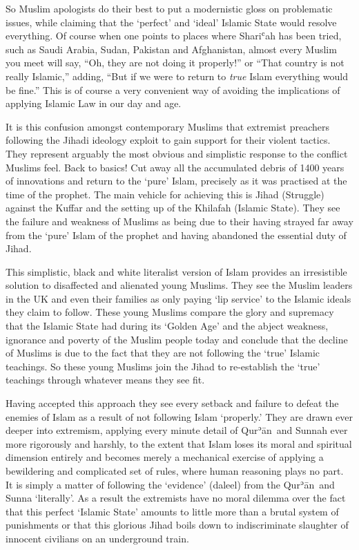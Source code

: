 \documentclass[12pt]{memoir}
\def\´{ʾ} %
\def\`{ʿ} %
\newcommand{\cor}[2]{#2} %
\def \Quran{Qur\-\´ān} %
\def\–{-\hskip0pt}
\begin{document}
So Muslim apologists do their best to put a modernistic gloss
on problematic issues, while claiming
that the ‘perfect’ and ‘ideal’ Islamic State would resolve everything.
Of course when one points to places where Shari\`ah has been tried,
such as Saudi Arabia, Sudan, Pakistan and Afghanistan,
almost every Muslim you meet will say,
“Oh, they are not doing it properly!” or
“That country is not really Islamic,” adding,
“But if we were to return to \emph{true} Islam everything would be fine.”
This is of course a very convenient way of avoiding
the implications of applying Islamic Law in our day and age.

It is this confusion amongst contemporary Muslims
that extremist preachers following the Jihadi ideology
exploit to gain support for their violent tactics.
They represent arguably the most obvious and simplistic response
to the conflict Muslims feel.
Back to basics! Cut away all the accumulated debris of 1400 years
of innovations and return to the ‘pure’ Islam,
precisely as it was practised at the time of the prophet.
The main vehicle for achieving this is Jihad (Struggle)
against the Kuffar and the setting up of the Khilafah (Islamic State).
They see the failure and weakness of Muslims as being due to
their having strayed far away from the ‘pure’ Islam of the prophet
and having abandoned the essential duty of Jihad.

This simplistic, black and white literalist version of Islam provides
an irresistible solution to disaffected and alienated young Muslims.
They see the Muslim leaders in the UK and even their families
as only paying ‘lip service’ to the Islamic ideals they claim to follow.
These young Muslims compare the glory and supremacy
that the Islamic State had during its ‘Golden Age’
and the abject weakness, ignorance and poverty of the Muslim people today
and conclude that the decline of Muslims is due to the fact
that they are not following the ‘true’ Islamic teachings.
So these young Muslims join the Jihad to re\–establish
the ‘true’ teachings through whatever means they see fit.

Having accepted this approach they see every setback
and failure to defeat the enemies of Islam
as a result of not following Islam ‘properly.’
They are drawn ever deeper into extremism, applying every minute detail
of \Quran\ and Sunnah ever more rigorously and harshly,
to the extent that Islam loses it\cor{’}{}s moral and spiritual dimension
entirely and becomes merely a mechanical exercise of applying a bewildering
and complicated set of rules, where human reasoning plays no part.
It is simply a matter of following the ‘evidence’ (daleel)
from the \Quran\ and Sunna ‘literally’.
As a result the extremists have no moral dilemma over the fact
that this perfect ‘Islamic State’ amounts to little more than
a brutal system of punishments or that this glorious Jihad boils down to
indiscriminate slaughter of innocent civilians on an underground train.
\end{document}
